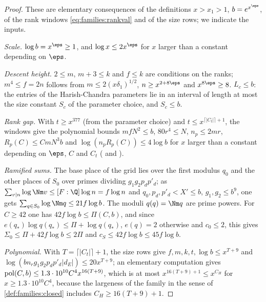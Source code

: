\begin{proof}
These are elementary consequences of the definitions $x>x_1>1$, $b=e^{x^\eps}$, of the rank windows
\eqref{eq:families:rankval} and of the size rows; we indicate the inputs.

\emph{Scale.} $\log b=x^\eps\ge1$, and $\log x\le2x^\eps$ for $x$ larger than a constant depending on $\eps$.

\emph{Descent height.} $2\le m$, $m+3\le k$ and $f\le k$ are conditions on the ranks; $m^4\le f=2n$ follows from
$m\le2(x\delta_1)^{1/2}$, $n\ge x^{2+8\eps}$ and $x^{8\eps}\ge8$. $L_c\le b$: the entries of the Harish-Chandra parameters lie in
an interval of length at most the size constant $S_c$ of the parameter choice, and $S_c\le b$.

\emph{Rank gap.} With $t\ge x^{377}$ (from the parameter choice) and $t\le x^{\lceil|C_t|\rceil+1}$, the windows give the
polynomial bounds $mfN^2\le b$, $80r^4\le N$, $n_p\le2mr$, $R_p(C)\le CmN^3b$ and $\log(n_pR_p(C))\le4\log b$ for $x$ larger
than a constant depending on $\eps$, $C$ and $C_t$ ( and ).

\emph{Ramified sums.} The base place of the grid lies over the first modulus $q_0$ and the other places of $S_0$ over primes
dividing $g_1g_2p_dp'_d$; as $\sum_{v\mid n}\log\Nm v\le[F:\Q]\log n=f\log n$ and $q_0,p_d,p'_d<X'\le b$, $g_1,g_2\le b^9$, one
gets $\sum_{q\in S_0}\log\Nm q\le21f\log b$. The moduli $q(q)=\Nm q$ are prime powers. For $C\ge42$ one has
$42f\log b\le\Pi(C,b)$, and since $e(q_*)\log q(q_*)\le\Pi+\log q(q_*)$, $e(q)=2$ otherwise and $c_0\le2$, this gives
$\Sigma_0\le\Pi+42f\log b\le2\Pi$ and $c_S\le42f\log b\le45f\log b$.

\emph{Polynomial.} With $T=\lceil|C_t|\rceil+1$, the size rows give $f,m,k,t,\log b\le x^{T+9}$ and
$\log(bn_rg_1g_2p_dp'_d|d_E|)\le20x^{T+9}$; an elementary computation gives $\operatorname{pol}(C,b)\le1.3\cdot10^{10}C^4x^{16(T+9)}$,
which is at most $x^{16(T+9)+1}\le x^{C_H}$ for $x\ge1.3\cdot10^{10}C^4$, because the largeness of the family in the
sense of \cref{def:families:closed} includes $C_H\ge16(T+9)+1$.
\end{proof}

